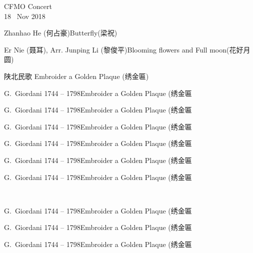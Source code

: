 \documentclass[letter,6pt,poets]{ConcProg}
\begin{document}
\begin{programme}{
    CFMO Concert
\\  {\normalsize 18 ~Nov 2018}
}
  \begin{part}[]
    \begin{composition}{Zhanhao He (何占豪)}{}{Butterfly(梁祝)}{}
    \end{composition}
    \begin{composition}{Er Nie (聂耳), Arr. Junping Li (黎俊平)}{}{Blooming flowers and Full moon(花好月圆)}{}      
    \end{composition}
    
    \begin{composition}{陕北民歌} {}{Embroider a Golden Plaque (绣金匾)}{}
                   {}{}
    \end{composition}
    \begin{composition}{G.~Giordani} {1744 -- 1798}{Embroider a Golden Plaque (绣金匾}{}
                   {}{}
    \end{composition}
    \begin{composition}{G.~Giordani} {1744 -- 1798}{Embroider a Golden Plaque (绣金匾}{}
                   {}{}
    \end{composition}
    \begin{composition}{G.~Giordani} {1744 -- 1798}{Embroider a Golden Plaque (绣金匾}{}
                   {}{}
    \end{composition}
    \begin{composition}{G.~Giordani} {1744 -- 1798}{Embroider a Golden Plaque (绣金匾}{}
                   {}{}
    \end{composition}
    \begin{composition}{G.~Giordani} {1744 -- 1798}{Embroider a Golden Plaque (绣金匾}{}
                   {}{}
    \end{composition}
    \begin{composition}{G.~Giordani} {1744 -- 1798}{Embroider a Golden Plaque (绣金匾}{}
                   {}{}
    \end{composition}\\
    \begin{composition}{G.~Giordani} {1744 -- 1798}{Embroider a Golden Plaque (绣金匾}{}
                   {}{}
    \end{composition}
    \begin{composition}{G.~Giordani} {1744 -- 1798}{Embroider a Golden Plaque (绣金匾}{}
                   {}{}
    \end{composition}
    \begin{composition}{G.~Giordani} {1744 -- 1798}{Embroider a Golden Plaque (绣金匾}{}
                   {}{}
    \end{composition}
    

\end{part}
\end{programme}
\end{document}

